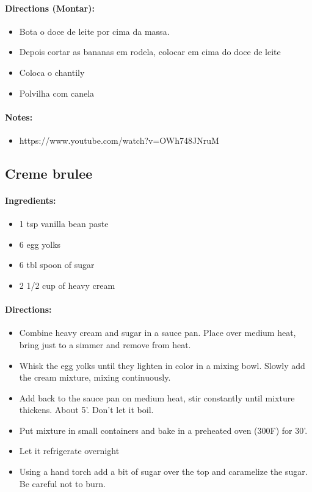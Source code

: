 \documentclass{article}
\begin{document}
\paragraph{Directions (Montar):}
\begin{itemize}
	\item Bota o doce de leite por cima da massa.
	\item Depois cortar as bananas em rodela, colocar em cima do doce de leite
	\item Coloca o chantily
	\item Polvilha com canela
\end{itemize}

\paragraph{Notes:}
\begin{itemize}
	\item https://www.youtube.com/watch?v=OWh748JNruM
\end{itemize}

\subsection{Creme brulee}

\paragraph{Ingredients:}

\begin{itemize}
\item 1 tsp vanilla bean paste
\item 6 egg yolks
\item 6 tbl spoon of sugar
\item 2 1/2 cup of heavy cream
\end{itemize}

\paragraph{Directions:}
\begin{itemize}
\item Combine heavy cream and sugar in a sauce pan. Place over medium heat, bring just to a simmer and remove from heat.

\item Whisk the egg yolks until they lighten in color in a mixing bowl. Slowly add the cream mixture, mixing continuously.
\item Add back to the sauce pan on medium heat, stir constantly until mixture thickens. About 5'. Don't let it boil.
\item Put mixture in small containers and bake in a preheated oven (300F) for 30'. 
\item Let it refrigerate overnight
\item Using a hand torch add a bit of sugar over the top and caramelize the sugar. Be careful not to burn.
\end{itemize}
\end{document}
